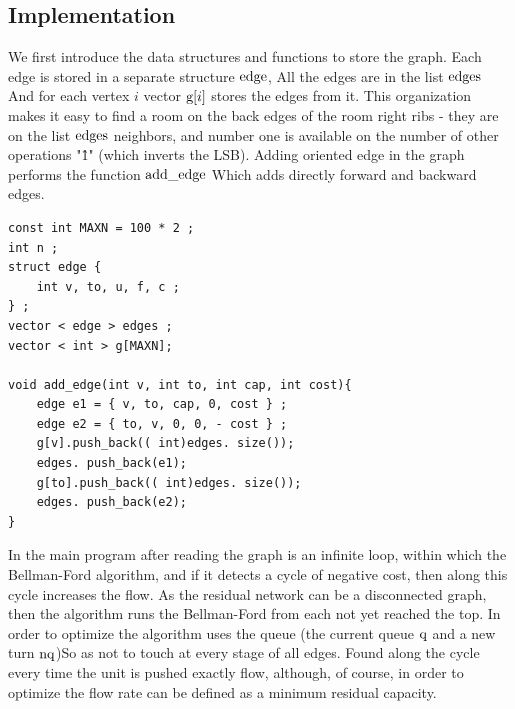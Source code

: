\subsection{ Implementation }

We first introduce the data structures and functions to store the graph. Each edge is stored in a separate structure $\rm edge$, All the edges are in the list $\rm edges$ And for each vertex $i$ vector ${\rm g} [i]$ stores the edges from it. This organization makes it easy to find a room on the back edges of the room right ribs - they are on the list $\rm edges$ neighbors, and number one is available on the number of other operations "\^ 1" (which inverts the LSB). Adding oriented edge in the graph performs the function $\rm add \_edge$ Which adds directly forward and backward edges.

\begin{verbatim}
const int MAXN = 100 * 2 ;
int n ;
struct edge {
    int v, to, u, f, c ;
} ;
vector < edge > edges ;
vector < int > g[MAXN];
 
void add_edge(int v, int to, int cap, int cost){
    edge e1 = { v, to, cap, 0, cost } ;
    edge e2 = { to, v, 0, 0, - cost } ;
    g[v].push_back(( int)edges. size());
    edges. push_back(e1);
    g[to].push_back(( int)edges. size());
    edges. push_back(e2);
} 
\end{verbatim}
In the main program after reading the graph is an infinite loop, within which the Bellman-Ford algorithm, and if it detects a cycle of negative cost, then along this cycle increases the flow. As the residual network can be a disconnected graph, then the algorithm runs the Bellman-Ford from each not yet reached the top. In order to optimize the algorithm uses the queue (the current queue $\rm q$ and a new turn $\rm nq$)So as not to touch at every stage of all edges. Found along the cycle every time the unit is pushed exactly flow, although, of course, in order to optimize the flow rate can be defined as a minimum residual capacity.

